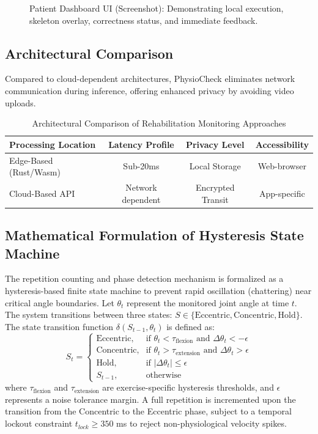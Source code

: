 \documentclass[conference]{IEEEtran}
\begin{document}
\begin{figure}[htbp]
  \centering
  \fbox{\rule{0pt}{1.5in} \rule{0.9\linewidth}{0pt}} 
  \caption{Patient Dashboard UI (Screenshot): Demonstrating local execution, skeleton overlay, correctness status, and immediate feedback.}
  \label{fig:dashboard}
\end{figure}

\subsection{Architectural Comparison}
Compared to cloud-dependent architectures, PhysioCheck eliminates network communication during inference, offering enhanced privacy by avoiding video uploads.

\begin{table}[htbp]
  \caption{Architectural Comparison of Rehabilitation Monitoring Approaches}
  \label{tab:arch_compare}
  \centering
  \renewcommand{\arraystretch}{1.3}
  \setlength{\tabcolsep}{4pt}
  \begin{tabular}{|l|c|c|c|}
    \hline
    \textbf{Processing Location} & \textbf{Latency Profile} & \textbf{Privacy Level} & \textbf{Accessibility} \\
    \hline
    Edge-Based (Rust/Wasm) & Sub-20ms & Local Storage & Web-browser \\
    Cloud-Based API & Network dependent & Encrypted Transit & App-specific \\
    \hline
  \end{tabular}
\end{table}

\subsection{Mathematical Formulation of Hysteresis State Machine}
The repetition counting and phase detection mechanism is formalized as a hysteresis-based finite state machine to prevent rapid oscillation (chattering) near critical angle boundaries. Let $\theta_t$ represent the monitored joint angle at time $t$. The system transitions between three states: $S \in \{ \text{Eccentric}, \text{Concentric}, \text{Hold} \}$. The state transition function $\delta(S_{t-1}, \theta_t)$ is defined as:
\begin{equation}
S_t = 
\begin{cases} 
\text{Eccentric}, & \text{if } \theta_t < \tau_{\text{flexion}} \text{ and } \Delta \theta_t < -\epsilon \\
\text{Concentric}, & \text{if } \theta_t > \tau_{\text{extension}} \text{ and } \Delta \theta_t > \epsilon \\
\text{Hold}, & \text{if } |\Delta \theta_t| \le \epsilon \\
S_{t-1}, & \text{otherwise}
\end{cases}
\end{equation}
where $\tau_{\text{flexion}}$ and $\tau_{\text{extension}}$ are exercise-specific hysteresis thresholds, and $\epsilon$ represents a noise tolerance margin. A full repetition is incremented upon the transition from the Concentric to the Eccentric phase, subject to a temporal lockout constraint $t_{lock} \ge 350$ ms to reject non-physiological velocity spikes.
\end{document}
